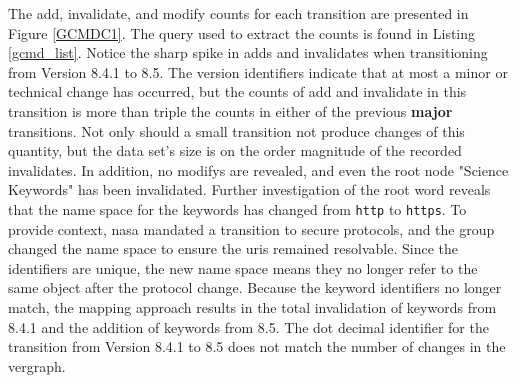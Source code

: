 The \gls{add}, \gls{invalidate}, and \gls{modify} counts for each transition are presented in Figure \ref{GCMDC1}.
The query used to extract the counts is found in Listing \ref{gcmd_list}.
Notice the sharp spike in \glspl{add} and \glspl{invalidate} when transitioning from Version 8.4.1 to 8.5.
The version identifiers indicate that at most a minor or technical change has occurred, but the counts of \gls{add} and \gls{invalidate} in this transition is more than triple the counts in either of the previous \textbf{major} transitions.
Not only should a small transition not produce changes of this quantity, but the data set's size is on the order magnitude of the recorded \glspl{invalidate}.
In addition, no \glspl{modify} are revealed, and even the root node "Science Keywords" has been invalidated.
Further investigation of the root word reveals that the name space for the keywords has changed from \texttt{http} to \texttt{https}.
To provide context, \gls{nasa} mandated a transition to secure protocols, and the group changed the name space to ensure the \glspl{uri} remained resolvable.
Since the identifiers are unique, the new name space means they no longer refer to the same object after the protocol change.
Because the keyword identifiers no longer match, the mapping approach results in the total invalidation of keywords from 8.4.1 and the addition of keywords from 8.5.
The dot decimal identifier for the transition from Version 8.4.1 to 8.5 does not match the number of changes in the \gls{vergraph}.

